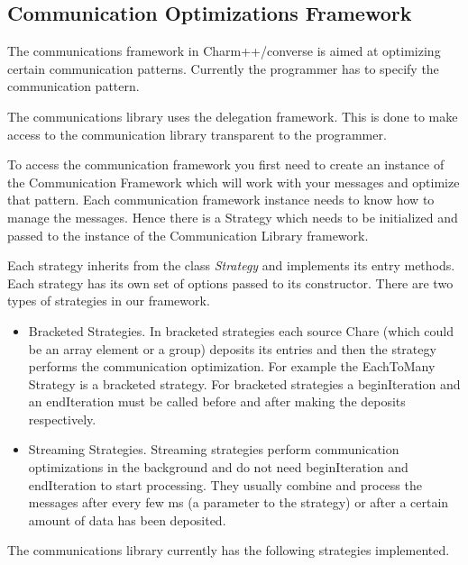 \subsection{Communication Optimizations Framework}

The communications framework in Charm++/converse is aimed at
optimizing certain communication patterns. Currently the programmer
has to specify the communication pattern. 

The communications library uses the delegation framework. This is done
to make access to the communication library transparent to the
programmer. 

To access the communication framework you first need to create an
instance of the Communication Framework which will work with your
messages and optimize that pattern. Each communication framework
instance needs to know how to manage the messages. Hence there is a
Strategy which needs to be initialized and passed to the instance of
the Communication Library framework. 

Each strategy inherits from the class {\em Strategy} and implements
its entry methods.  Each strategy has its own set of options passed to
its constructor. There are two types of strategies in our framework.

\begin{itemize}

\item Bracketed Strategies. In bracketed strategies each source Chare
(which could be an array element or a group) deposits its entries and
then the strategy performs the communication optimization. For example
the EachToMany Strategy is a bracketed strategy. For bracketed
strategies a beginIteration and an endIteration must be called before
and after making the deposits respectively. 

\item Streaming Strategies. Streaming strategies perform communication
optimizations in the background and do not need beginIteration and
endIteration to start processing. They usually combine and process
the messages after every few ms (a parameter to the strategy) or after
a certain amount of data has been deposited.

\end{itemize}

The communications library currently has the following strategies
implemented.

